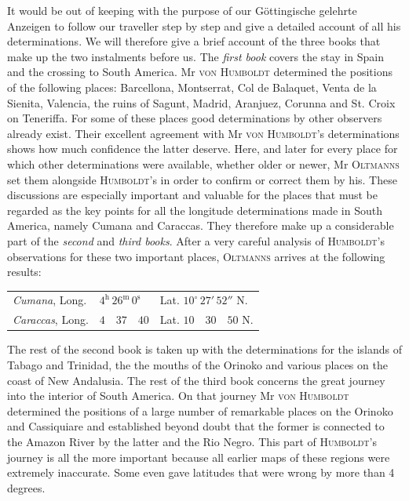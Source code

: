 It would be out of keeping with the purpose of our Göttingische gelehrte Anzeigen to follow our traveller step by step and give a detailed account of all his determinations. We will therefore give a brief account of the three books that make up the two instalments before us. The \emph{first book} covers the stay in Spain and the crossing to South America. Mr \textsc{von Humboldt} determined the positions of the following places: Barcellona, Montserrat, Col de Balaquet, Venta de la Sienita, Valencia, the ruins of Sagunt, Madrid, Aranjuez, Corunna and St. Croix on Teneriffa. For some of these places good determinations by other observers already exist. Their excellent agreement with Mr \textsc{von Humboldt}’s determinations shows how much confidence the latter deserve. Here, and later for every place for which other determinations were available, whether older or newer, Mr \textsc{Oltmanns} set them alongside \textsc{Humboldt}’s in order to confirm or correct them by his. These discussions are especially important and valuable for the places that must be regarded as the key points for all the longitude determinations made in South America, namely Cumana and Caraccas. They therefore make up a considerable part of the \emph{second} and \emph{third books}. After a very careful analysis of \textsc{Humboldt}’s observations for these two important places, \textsc{Oltmanns} arrives at the following results:
\begin{center} \begin{tabular}{@{}lll@{}} \textit{Cumana}, Long. & $4^{\mathrm h}\,26^{\mathrm m}\,0^{\mathrm s}$ & Lat. $10^\circ\,27'\,52''$ N. \\ \textit{Caraccas}, Long. & $4\quad 37\quad 40$ & Lat. $10\quad 30\quad 50$ N. \\ \end{tabular} \end{center}
\noindent The rest of the second book is taken up with the determinations for the islands of Tabago and Trinidad, the the mouths of the Orinoko and various places on the coast of New Andalusia. The rest of the third book concerns the great journey into the interior of South America. On that journey Mr \textsc{von Humboldt} determined the positions of a large number of remarkable places on the Orinoko and Cassiquiare and established beyond doubt that the former is connected to the Amazon River by the latter and the Rio Negro. This part of \textsc{Humboldt}’s journey is all the more important because all earlier maps of these regions were extremely inaccurate. Some even gave latitudes that were wrong by more than 4 degrees.

